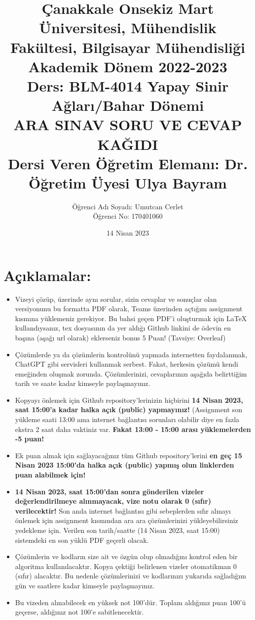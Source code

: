 \documentclass[11pt]{article}
\title{Çanakkale Onsekiz Mart Üniversitesi, Mühendislik Fakültesi, Bilgisayar Mühendisliği Akademik Dönem 2022-2023\\
Ders: BLM-4014 Yapay Sinir Ağları/Bahar Dönemi\\ 
ARA SINAV SORU VE CEVAP KAĞIDI\\
Dersi Veren Öğretim Elemanı: Dr. Öğretim Üyesi Ulya Bayram}
\author{%
\begin{minipage}{\textwidth}
\raggedright
Öğrenci Adı Soyadı: Umutcan Cerlet\\ %
Öğrenci No: 170401060
\end{minipage}%
}
\date{14 Nisan 2023}
\begin{document}
\maketitle

\vspace{-.5in}
\section*{Açıklamalar:}
\begin{itemize}
    \item Vizeyi çözüp, üzerinde aynı sorular, sizin cevaplar ve sonuçlar olan versiyonunu bu formatta PDF olarak, Teams üzerinden açtığım assignment kısmına yüklemeniz gerekiyor. Bu bahsi geçen PDF'i oluşturmak için LaTeX kullandıysanız, tex dosyasının da yer aldığı Github linkini de ödevin en başına (aşağı url olarak) eklerseniz bonus 5 Puan! (Tavsiye: Overleaf)
    \item Çözümlerde ya da çözümlerin kontrolünü yapmada internetten faydalanmak, ChatGPT gibi servisleri kullanmak serbest. Fakat, herkesin çözümü kendi emeğinden oluşmak zorunda. Çözümlerinizi, cevaplarınızı aşağıda belirttiğim tarih ve saate kadar kimseyle paylaşmayınız. 
    \item Kopyayı önlemek için Github repository'lerinizin hiçbirini \textbf{14 Nisan 2023, saat 15:00'a kadar halka açık (public) yapmayınız!} (Assignment son yükleme saati 13:00 ama internet bağlantısı sorunları olabilir diye en fazla ekstra 2 saat daha vaktiniz var. \textbf{Fakat 13:00 - 15:00 arası yüklemelerden -5 puan!}
    \item Ek puan almak için sağlayacağınız tüm Github repository'lerini \textbf{en geç 15 Nisan 2023 15:00'da halka açık (public) yapmış olun linklerden puan alabilmek için!}
    \item \textbf{14 Nisan 2023, saat 15:00'dan sonra gönderilen vizeler değerlendirilmeye alınmayacak, vize notu olarak 0 (sıfır) verilecektir!} Son anda internet bağlantısı gibi sebeplerden sıfır almayı önlemek için assignment kısmından ara ara çözümlerinizi yükleyebilirsiniz yedekleme için. Verilen son tarih/saatte (14 Nisan 2023, saat 15:00) sistemdeki en son yüklü PDF geçerli olacak.
    \item Çözümlerin ve kodların size ait ve özgün olup olmadığını kontrol eden bir algoritma kullanılacaktır. Kopya çektiği belirlenen vizeler otomatikman 0 (sıfır) alacaktır. Bu nedenle çözümlerinizi ve kodlarınızı yukarıda sağladığım gün ve saatlere kadar kimseyle paylaşmayınız.
    \item Bu vizeden alınabilecek en yüksek not 100'dür. Toplam aldığınız puan 100'ü geçerse, aldığınız not 100'e sabitlenecektir.

\end{itemize}
\end{document}

